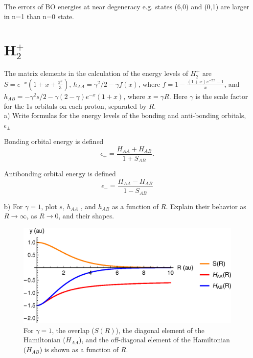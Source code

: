 \documentclass{article}
\begin{document}
{\color{blue}
  The errors of BO energies at near degeneracy e.g. states (6,0) and (0,1) are larger
  in n=1 than n=0 state.}

\pagebreak

\section*{H$_2^+$}

The matrix elements in the calculation of the energy levels of
$H_2^+$ are $S = e^{-x}(1 +x + \frac{x^2}{3})$, $h_{AA} = \gamma^2/2 - \gamma f(x)$,
where $f = 1-\frac{(1+x)e^{-2x}-1}{x}$, and
$h_{AB}=-\gamma^2s/2 - \gamma(2 - \gamma) e^{-x}(1 + x)$,
where $x = \gamma R$. Here $\gamma$ is the scale factor for the 1s
orbitals on each proton, separated by $R$.
\\

\noindent a) Write formulas for the energy levels of the bonding and anti-bonding orbitals,
$\epsilon_{\pm}$
\\

{\color{blue}
Bonding orbital energy is defined
\begin{equation}
  \epsilon_+ = \frac{H_{AA}+H_{AB}}{1+S_{AB}}.
\end{equation}

Antibonding orbital energy is defined
\begin{equation}
  \epsilon_- = \frac{H_{AA}-H_{AB}}{1-S_{AB}}
\end{equation}
}

\noindent b) For $\gamma=1$, plot $s$, $h_{AA}$ , and $h_{AB}$ as a function
of $R$. Explain their behavior as $R\rightarrow \infty$, as $R\rightarrow 0$,
and their shapes.

\begin{figure}[H]
  \centering
  \includegraphics[scale=0.75]{h2_cation.eps}
  \caption{For $\gamma=1$, the overlap ($S(R)$),
    the diagonal element of the Hamiltonian ($H_{AA}$), and the off-diagonal
    element of the Hamiltonian ($H_{AB}$) is shown as a function of $R$.}
  \label{fig:mat_elem}
\end{figure}
\end{document}
